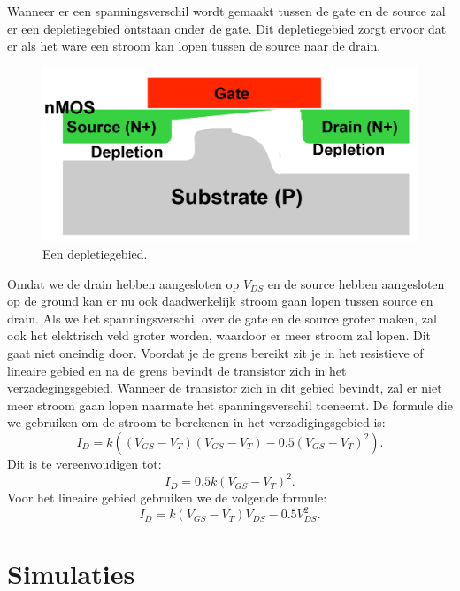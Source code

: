 \documentclass{scrartcl}  %
\begin{document}
Wanneer er een spanningsverschil wordt gemaakt tussen de gate en de source zal er een depletiegebied ontstaan onder de gate. Dit depletiegebied zorgt ervoor dat er als het ware een stroom kan lopen tussen de source naar de drain. \\
\begin{figure}[H]
\centering
		\includegraphics[width=\textwidth]{resources/depletiegebied}
		\caption{Een depletiegebied.\cite{nick-slides}}
		\label{fig:depletiegebied}
\end{figure}
Omdat we de drain hebben aangesloten op $V_{DS}$ en de source hebben aangesloten op de ground kan er nu ook daadwerkelijk stroom gaan lopen tussen source en drain. Als we het spanningsverschil over de gate en de source groter maken, zal ook het elektrisch veld groter worden, waardoor er meer stroom zal lopen. Dit gaat niet oneindig door. Voordat je de grens bereikt zit je in het resistieve of lineaire gebied en na de grens bevindt de transistor zich in het verzadegingsgebied. Wanneer de transistor zich in dit gebied bevindt, zal er niet meer stroom gaan lopen naarmate het spanningsverschil toeneemt. De formule die we gebruiken om de stroom te berekenen in het verzadigingsgebied is:
\begin{equation}
I_{D} = k((V_{GS} - V_{T})(V_{GS} - V_{T}) - 0.5(V_{GS} - V_{T})^{2}). 
\end{equation}
\newline Dit is te vereenvoudigen tot: 
\begin{equation} I_{D} = 0.5k(V_{GS} - V_{T})^{2}.
\end{equation}
\newline Voor het lineaire gebied gebruiken we de volgende formule: 
\begin{equation}
I_{D} = k(V_{GS} - V_{T})V_{DS} - 0.5V_{DS}^{2}.
\end{equation}


\section{Simulaties}
\end{document}
